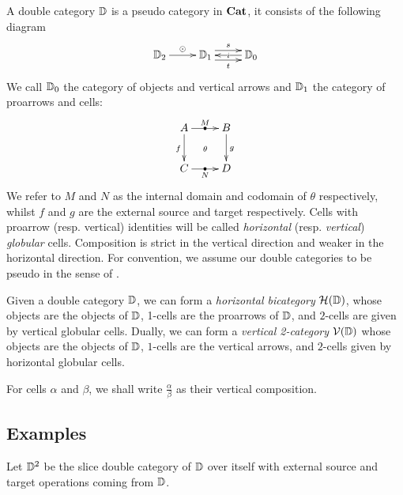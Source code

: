 \documentclass[9pt, leqno]{amsart}
\begin{document}
\begin{defn}
	A double category $\mathbb{D}$ is a pseudo category in $\mathbf{Cat}$, it consists of the following diagram 
	\begin{equation*}
		\xymatrix{
			\dcat{D}_2 \ar[r]^(.5){\odot} & \dcat{D}_1 \ar@<1ex>[r]^{s} \ar@<-1ex>[r]_{t} & \dcat{D}_0 \ar[l]|-{i}
		}
	\end{equation*}
	We call $\mathbb{D}_0$ the category of objects and vertical arrows and $\mathbb{D}_1$ the category of proarrows and cells:
	\begin{equation*}
		\xymatrix{
				A \ar[r]|-{\bullet}^-M \ar[d]_f \ar@{}[dr]|{\theta} & B \ar[d]^g \\  
				 C \ar[r]|-{\bullet}_-N & D  
		}
	\end{equation*}
	We refer to $M$ and $N$ as the internal domain and codomain of $\theta$ respectively, whilst $f$ and $g$ are the external source and target respectively. Cells with proarrow (resp. vertical) identities will be called \emph{horizontal} (resp. \emph{vertical}) \emph{globular} cells. Composition is strict in the vertical direction and weaker in the horizontal direction. For convention, we assume our double categories to be pseudo in the sense of \cite{Crutt}.
\end{defn}

\begin{defn}
	Given a double category $\mathbb{D}$, we  can form a \emph{horizontal bicategory} $\mathcal{H}(\mathbb{D})$, whose objects are the objects of $\mathbb{D}$, 1-cells are the proarrows of $\mathbb{D}$, and $2$-cells are given by vertical globular cells. Dually, we can form a \emph{vertical 2-category} $\mathcal{V}(\mathbb{D})$ whose objects are the objects of $\mathbb{D}$, $1$-cells are the vertical arrows, and $2$-cells given by horizontal globular cells. 
\end{defn}


\begin{notation}
	For cells $\alpha$ and $\beta$, we shall write $\frac{\alpha}{\beta}$ as their vertical composition.
\end{notation}

\subsection{Examples}

\begin{example}
	Let $\mathbb{D}^2$ be the slice double category of $\mathbb{D}$ over itself with external source and target operations coming from $\mathbb{D}$.
\end{example}
\end{document}
